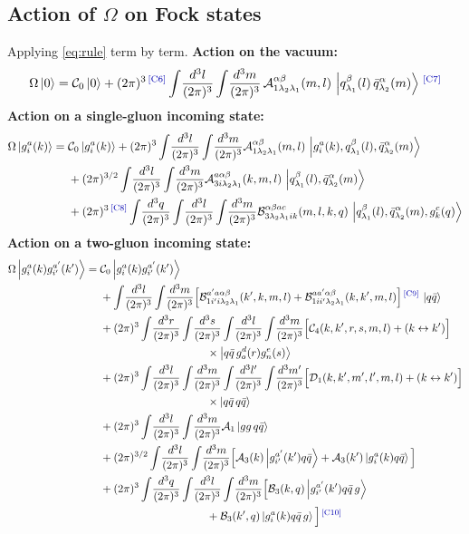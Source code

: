 \documentclass[11pt]{article}
\newcommand{\ip}[1]{\int\!\frac{d^{3}#1}{(2\pi)^{3}}}
\newcommand{\ket}[1]{\left|#1\right\rangle}
\newcommand{\vac}{\ket{0}}
\newcommand{\OM}{\Omega}
\newcommand{\qk}[3]{q^{#1}_{#2}(#3)}
\newcommand{\aqk}[3]{\bar q^{#1}_{#2}(#3)}
\newcommand{\gl}[3]{g^{#1}_{#2}(#3)}
\newcommand{\A}{\mathcal{A}}
\newcommand{\B}{\mathcal{B}}
\newcommand{\C}{\mathcal{C}}
\newcommand{\D}{\mathcal{D}}
\newcommand{\chg}[1]{{\color{blue!70!black}\textsuperscript{\,[C#1]}}}
\begin{document}
\subsection{Action of $\OM$ on Fock states}

Applying \eqref{eq:rule} term by term. \textbf{Action on the vacuum:}
\begin{equation}
\OM\vac=\C_{0}\vac
+(2\pi)^{3}\chg{6}\ip{l}\ip{m}\,\A^{\alpha\beta}_{1\lambda_{2}\lambda_{1}}(m,l)\,
\ket{\qk{\beta}{\lambda_{1}}{l}\,\aqk{\alpha}{\lambda_{2}}{m}}\chg{7}
\label{eq:Omvac}
\end{equation}
\textbf{Action on a single-gluon incoming state:}
\begin{align}
\OM\ket{\gl{a}{i}{k}}=\;&\C_{0}\ket{\gl{a}{i}{k}}
+(2\pi)^{3}\ip{l}\ip{m}\A^{\alpha\beta}_{1\lambda_{2}\lambda_{1}}(m,l)\,
\ket{\gl{a}{i}{k},\qk{\beta}{\lambda_{1}}{l},\aqk{\alpha}{\lambda_{2}}{m}}\nonumber\\
&+(2\pi)^{3/2}\ip{l}\ip{m}\A^{a\alpha\beta}_{3i\lambda_{2}\lambda_{1}}(k,m,l)\,
\ket{\qk{\beta}{\lambda_{1}}{l},\aqk{\alpha}{\lambda_{2}}{m}}\nonumber\\
&+(2\pi)^{3}\chg{8}\ip{q}\ip{l}\ip{m}\B^{\alpha\beta ac}_{3\lambda_{2}\lambda_{1}ik}(m,l,k,q)\,
\ket{\qk{\beta}{\lambda_{1}}{l},\aqk{\alpha}{\lambda_{2}}{m},\gl{c}{k}{q}}
\label{eq:Omg}
\end{align}
\textbf{Action on a two-gluon incoming state:}
\begin{align}
\OM\ket{\gl{a}{i}{k}\gl{a'}{i'}{k'}}=\;&\C_{0}\ket{\gl{a}{i}{k}\gl{a'}{i'}{k'}}
\nonumber\\
&+\ip{l}\ip{m}\Big[\B^{a'a\alpha\beta}_{1i'i\lambda_{2}\lambda_{1}}(k',k,m,l)
+\B^{aa'\alpha\beta}_{1ii'\lambda_{2}\lambda_{1}}(k,k',m,l)\Big]\chg{9}\,
\ket{q\bar q}\nonumber\\
&+(2\pi)^{3}\ip{r}\ip{s}\ip{l}\ip{m}\Big[\C_{4}(k,k',r,s,m,l)+(k\leftrightarrow k')\Big]
\nonumber\\&\hspace{3.4cm}\times\ket{q\bar q\,\gl{d}{o}{r}\gl{e}{n}{s}}\nonumber\\
&+(2\pi)^{3}\ip{l}\ip{m}\ip{l'}\ip{m'}\Big[\D_{1}(k,k',m',l',m,l)+(k\leftrightarrow k')\Big]
\nonumber\\&\hspace{3.4cm}\times\ket{q\bar q\,q\bar q}\nonumber\\
&+(2\pi)^{3}\ip{l}\ip{m}\A_{1}\ket{gg\,q\bar q}\nonumber\\
&+(2\pi)^{3/2}\ip{l}\ip{m}\Big[\A_{3}(k)\ket{\gl{a'}{i'}{k'}q\bar q}
+\A_{3}(k')\ket{\gl{a}{i}{k}q\bar q}\Big]\nonumber\\
&+(2\pi)^{3}\ip{q}\ip{l}\ip{m}\Big[\B_{3}(k,q)\ket{\gl{a'}{i'}{k'}q\bar q\,g}
\nonumber\\&\hspace{3.4cm}
+\B_{3}(k',q)\ket{\gl{a}{i}{k}q\bar q\,g}\Big]\chg{10}
\label{eq:Omgg}
\end{align}
\end{document}
